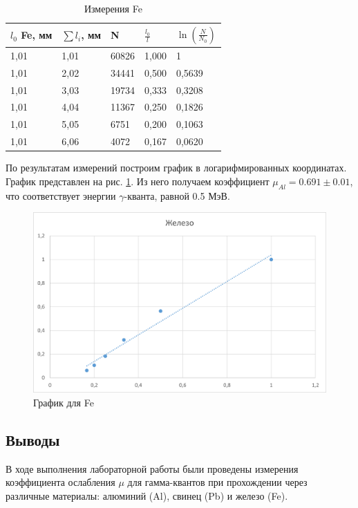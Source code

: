 \begin{table}[!ht]
    \centering
    \label{table:Fe}
    \caption{Измерения Fe}
    \begin{tabular}{|l|l|l|l|l|}
    \hline
        $l_0$ Fe, мм & $\sum l_i$, мм & N & $\frac {l_0}{l}$ & $\ln( \frac {N} {N_0} )$  \\ \hline
        1,01 & 1,01 & 60826 & 1,000 & 1  \\ \hline
        1,01 & 2,02 & 34441 & 0,500 & 0,5639  \\ \hline
        1,01 & 3,03 & 19734 & 0,333 & 0,3208  \\ \hline
        1,01 & 4,04 & 11367 & 0,250 & 0,1826  \\ \hline
        1,01 & 5,05 & 6751 & 0,200 & 0,1063  \\ \hline
        1,01 & 6,06 & 4072 & 0,167 & 0,0620  \\ \hline
    \end{tabular}
\end{table}

По результатам измерений построим график в логарифмированных координатах. График представлен на рис. \ref{fig:Fe_plot}. Из него получаем коэффициент $\mu_{Al} = 0.691 \pm 0.01$, что соответствует энергии $\gamma$-кванта, равной 0.5 МэВ.

\begin{figure}[h]
    \centering
    \includegraphics[width=1\textwidth]{Fe_plot.png}
    \caption{График для Fe}
    \label{fig:Fe_plot}
\end{figure}

\newpage
\subsection{Выводы}
В ходе выполнения лабораторной работы были проведены измерения коэффициента ослабления $\mu$ для гамма-квантов при прохождении через различные материалы: алюминий (Al), свинец (Pb) и железо (Fe).

